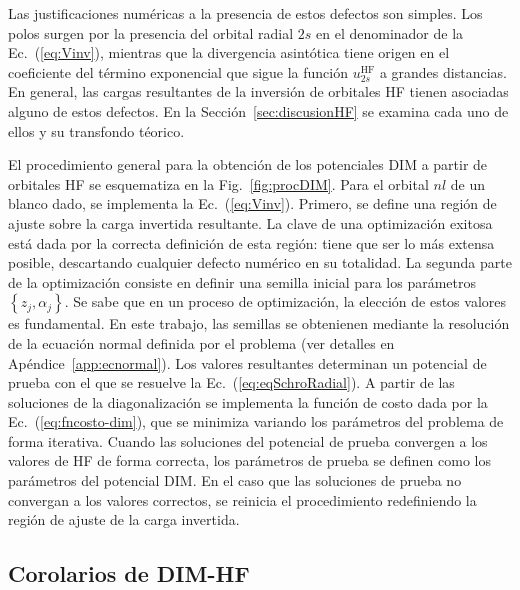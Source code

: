 Las justificaciones numéricas a la presencia de estos defectos son 
simples. Los polos surgen por la presencia del orbital radial $2s$ en el 
denominador de la Ec.~(\ref{eq:Vinv}), mientras que la divergencia 
asintótica tiene origen en el coeficiente del término exponencial que 
sigue la función $u_{2s}^{\mathrm{HF}}$ a grandes distancias.
En general, las cargas resultantes de la inversión de orbitales HF 
tienen asociadas alguno de estos defectos. En la 
Sección~\ref{sec:discusionHF} se examina cada uno de ellos y su 
transfondo téorico.

El procedimiento general para la obtención de los potenciales DIM a 
partir de orbitales HF se esquematiza en la Fig.~\ref{fig:procDIM}. Para 
el orbital $nl$ de un blanco dado, se implementa la Ec.~(\ref{eq:Vinv}). 
Primero, se define una región de ajuste sobre la carga invertida 
resultante. La clave de una optimización exitosa está dada por la 
correcta definición de esta región: tiene que ser lo más extensa 
posible, descartando cualquier defecto numérico en su totalidad. 
La segunda parte de la optimización consiste en definir una 
semilla inicial para los parámetros $\left\{z_j,\alpha_j\right\}$. Se 
sabe que en un proceso de optimización, la elección de estos valores es 
fundamental. En este trabajo, las semillas se obtenienen mediante la 
resolución de la ecuación normal definida por el problema (ver detalles 
en Apéndice~\ref{app:ecnormal}). Los valores resultantes determinan un 
potencial de prueba con el que se resuelve la 
Ec.~(\ref{eq:eqSchroRadial}). 
A partir de las soluciones de la diagonalización se implementa la 
función de costo dada por la Ec.~(\ref{eq:fncosto-dim}), que se minimiza 
variando los parámetros del problema de forma iterativa. Cuando las 
soluciones del potencial de prueba convergen a los valores de HF de 
forma correcta, los parámetros de prueba se definen como los parámetros 
del potencial DIM. En el caso que las soluciones de prueba no convergan 
a los valores correctos, se reinicia el procedimiento redefiniendo la 
región de ajuste de la carga invertida.

\subsection{Corolarios de DIM-HF}
\label{sec:corolarios}

